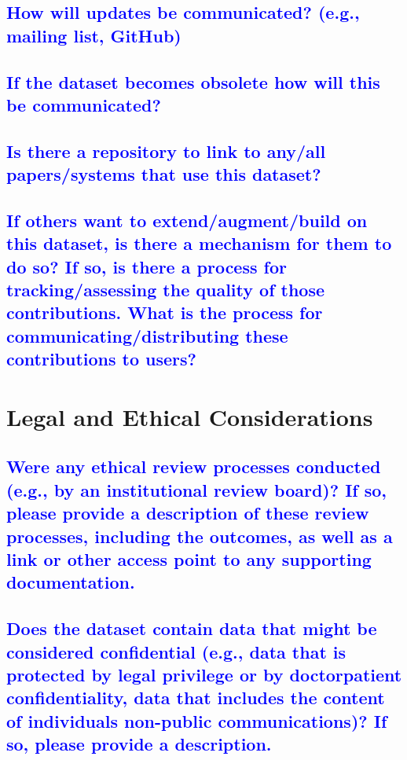 \documentclass[letterpaper, 10 pt, conference]{ieeeconf}  %
\begin{document}
\textcolor{blue}{\subsection{How will updates be communicated? (e.g., mailing
list, GitHub)}}
\lipsum[1]

\textcolor{blue}{\subsection{If the dataset becomes obsolete how will this be
communicated?}}
\lipsum[1]

\textcolor{blue}{\subsection{Is there a repository to link to any/all papers/systems that use this dataset?}}
\lipsum[1]

\textcolor{blue}{\subsection{If others want to extend/augment/build on this
dataset, is there a mechanism for them to do so?
If so, is there a process for tracking/assessing the
quality of those contributions. What is the process
for communicating/distributing these contributions
to users?}}
\lipsum[1]

\section{Legal and Ethical Considerations}

\textcolor{blue}{\subsection{Were any ethical review processes conducted (e.g., by an institutional review board)? If so, please provide a description of these review
processes, including the outcomes, as well as a link or other access point
to any supporting documentation.}}
\lipsum[1]

\textcolor{blue}{\subsection{Does the dataset contain data that might be considered confidential
(e.g., data that is protected by legal privilege or by doctorpatient confidentiality, data that includes the content of individuals non-public
communications)? If so, please provide a description.}}
\lipsum[1]
\end{document}
